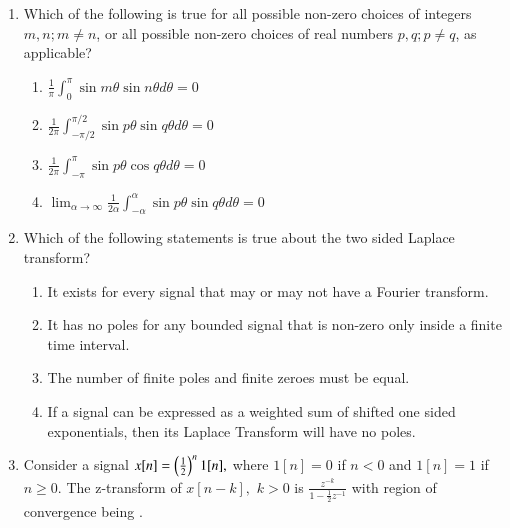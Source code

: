 \documentclass[journal,12pt,onecolumn]{IEEEtran}
\theoremstyle{remark}
\begin{document}
\begin{enumerate}[start=1, label=Q.\arabic*]
\hfill{}

\item Which of the following is true for all possible non-zero choices of integers $m, n; m \ne n$, or all possible non-zero choices of real numbers $p, q; p \ne q$, as applicable?
    \begin{enumerate}
        \item $\frac{1}{\pi}\int_{0}^{\pi}\sin m\theta \sin n\theta d\theta=0$
        \item $\frac{1}{2\pi}\int_{-\pi/2}^{\pi/2}\sin p\theta \sin q\theta d\theta=0$
        \item $\frac{1}{2\pi}\int_{-\pi}^{\pi}\sin p\theta \cos q\theta d\theta=0$
        \item $\lim_{\alpha\rightarrow\infty}\frac{1}{2\alpha}\int_{-\alpha}^{\alpha}\sin p\theta \sin q\theta d\theta=0$
    \end{enumerate}

\hfill{}

\item Which of the following statements is true about the two sided Laplace transform?
    \begin{enumerate}
        \item It exists for every signal that may or may not have a Fourier transform.
        \item It has no poles for any bounded signal that is non-zero only inside a finite time interval.
        \item The number of finite poles and finite zeroes must be equal.
        \item If a signal can be expressed as a weighted sum of shifted one sided exponentials, then its Laplace Transform will have no poles.
    \end{enumerate}

\hfill{}

\item Consider a signal $x[n]=\left(\frac{1}{2}\right)^{n}1[n],$ where $1[n]=0$ if $n<0$ and $1[n]=1$ if $n \ge 0$. The z-transform of $x[n-k],$ $k>0$ is $\frac{z^{-k}}{1-\frac{1}{2}z^{-1}}$ with region of convergence being \underline{\hspace{2cm}}.
    \begin{enumerate}
    \end{enumerate}


\end{enumerate}
\end{document}
